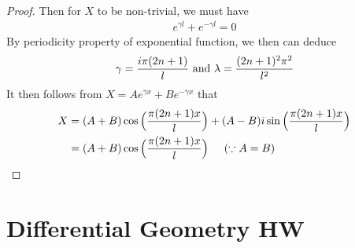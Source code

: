 \documentclass{report}
\begin{document}
\begin{proof}
Then for $X$ to be non-trivial, we must have  
 \begin{align*}
e^{\gamma l}+e^{-\gamma l} =0
\end{align*}
By periodicity property of exponential function, we then can deduce
\begin{align*}
\gamma = \frac{ i \pi(2n+1)}{l}\text{ and }\lambda = \frac{(2n+1)^2\pi ^2}{l^2}
\end{align*}
It then follows from $X=Ae^{\gamma x}+Be^{-\gamma x}$ that 
\begin{align*}
X&= (A+B) \cos \Big(\frac{\pi (2n +1) x}{l}\Big)+ (A-B)i\sin \Big(\frac{ \pi (2n+1)x}{l}\Big)\\
&=(A+B) \cos \Big(\frac{ \pi (2n+1) x}{l}\Big)\hspace{0.5cm}(\because A=B)
\end{align*}
\end{proof}
\chapter{Differential Geometry HW} 
\end{document}
